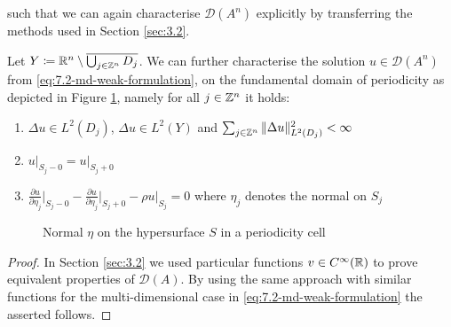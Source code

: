 such that we can again characterise $\mathcal{D}(A^{n})$ explicitly by transferring the methods used in Section \ref{sec:3.2}.

\begin{theorem} Let $Y \coloneqq \mathbb{R}^{n} \setminus \overline{\bigcup_{j \in \mathbb{Z}^{n}} D_{j}}$. We can further characterise the solution $u \in \mathcal{D}(A^{n})$ from \eqref{eq:7.2-md-weak-formulation}, on the fundamental domain of periodicity as depicted in  Figure \ref{fig:7.2}, namely for all $j \in \mathbb{Z}^{n}$ it holds:
	\begin{enumerate} %
		\item $\Delta u \in L^{2}(D_{j})$, $\Delta u \in L^{2}(Y)$ and $\sum_{j \in \mathbb{Z}^{n}} \|\Delta u \|_{L^{2}(D_{j})}^{2} < \infty$
		\item $u \big|_{S_{j} - 0} = u \big|_{S_{j} + 0}$
		\item $\frac{\partial u}{\partial \eta_{j}} \big|_{S_{j} - 0} - \frac{\partial u}{\partial \eta_{j}} \big|_{S_{j} + 0} - \rho u \big|_{S_{j}} = 0$ where $\eta_{j}$ denotes the normal on $S_{j}$
	\end{enumerate}
\end{theorem}

\begin{figure}[!ht] \centering
	\caption{Normal $\eta$ on the hypersurface $S$ in a periodicity cell}  \label{fig:7.2}
\end{figure}
	
\begin{proof}
 	In Section \ref{sec:3.2} we used particular functions $v \in C^{\infty}(\mathbb{R})$ to prove equivalent properties of $\mathcal{D}(A)$. By using the same approach with similar functions for the multi-dimensional case in \eqref{eq:7.2-md-weak-formulation} the asserted follows. %
\end{proof}

